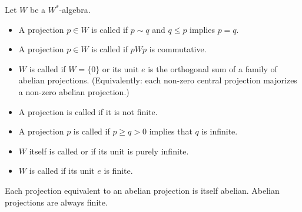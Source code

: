 Let $W$ be a $W^*$-algebra.
\begin{itemize}
\item A projection $p \in W$ is called  if $p \sim q$ and $q \leq p$ implies $p = q$.
\item A projection $p \in W$ is called  if $pWp$ is commutative.
\item $W$ is called  if $W = \{0\}$ or its unit $e$ is the orthogonal sum of a family of abelian projections. (Equivalently: each non-zero central projection majorizes a non-zero abelian projection.)
\item A projection is called  if it is not finite.
\item A projection $p$ is called  if $p \geq q > 0$ implies that $q$ is infinite.
\item $W$ itself is called  or  if its unit is purely infinite.
\item $W$ is called  if its unit $e$ is finite.
\end{itemize}
Each projection equivalent to an abelian projection is itself abelian. Abelian projections are always finite.
